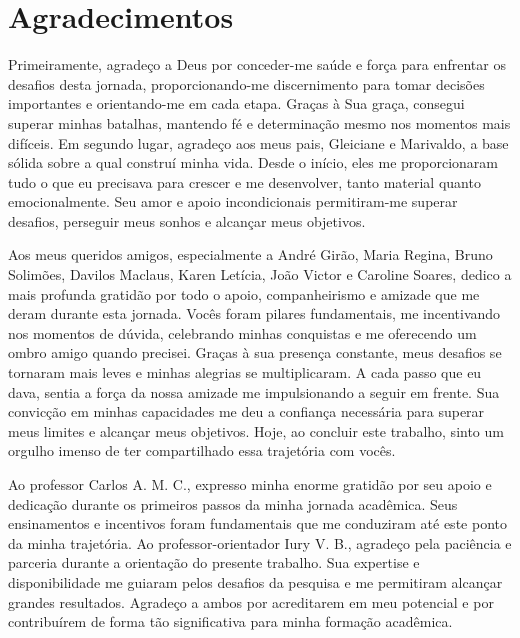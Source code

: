\chapter*{Agradecimentos}
\thispagestyle{empty}

Primeiramente, agradeço a Deus por conceder-me saúde e força para enfrentar os desafios desta jornada, proporcionando-me discernimento para tomar decisões importantes e orientando-me em cada etapa. Graças à Sua graça, consegui superar minhas batalhas, mantendo fé e determinação mesmo nos momentos mais difíceis. Em segundo lugar, agradeço aos meus pais, Gleiciane e Marivaldo, a base sólida sobre a qual construí minha vida. Desde o início, eles me proporcionaram tudo o que eu precisava para crescer e me desenvolver, tanto material quanto emocionalmente. Seu amor e apoio incondicionais permitiram-me superar desafios, perseguir meus sonhos e alcançar meus objetivos.

Aos meus queridos amigos, especialmente a André Girão, Maria Regina, Bruno Solimões, Davilos Maclaus, Karen Letícia, João Victor e Caroline Soares, dedico a mais profunda gratidão por todo o apoio, companheirismo e amizade que me deram durante esta jornada. Vocês foram pilares fundamentais, me incentivando nos momentos de dúvida, celebrando minhas conquistas e me oferecendo um ombro amigo quando precisei. Graças à sua presença constante, meus desafios se tornaram mais leves e minhas alegrias se multiplicaram. A cada passo que eu dava, sentia a força da nossa amizade me impulsionando a seguir em frente. Sua convicção em minhas capacidades me deu a confiança necessária para superar meus limites e alcançar meus objetivos. Hoje, ao concluir este trabalho, sinto um orgulho imenso de ter compartilhado essa trajetória com vocês.

Ao professor Carlos A. M. C., expresso minha enorme gratidão por seu apoio e dedicação durante os primeiros passos da minha jornada acadêmica. Seus ensinamentos e incentivos foram fundamentais que me conduziram até este ponto da minha trajetória. Ao professor-orientador Iury V. B., agradeço pela paciência e parceria durante a orientação do presente trabalho. Sua expertise e disponibilidade me guiaram pelos desafios da pesquisa e me permitiram alcançar grandes resultados. Agradeço a ambos por acreditarem em meu potencial e por contribuírem de forma tão significativa para minha formação acadêmica.